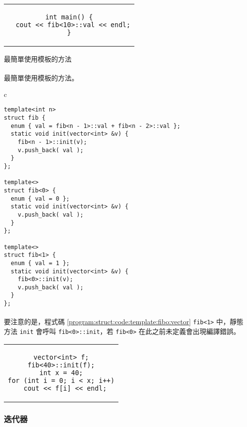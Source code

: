 \documentclass[12pt,a4paper,oneside]{report}
\begin{document}
\begin{CJK}{UTF8}{bkai}
\begin{code}[h!]
\begin{tabular}{c}
\begin{lstlisting}
int main() {
  cout << fib<10>::val << endl;
}
\end{lstlisting}
\end{tabular}
\caption{最簡單使用模板的方法}
\label{program:struct:code:template:fibo}
\end{code}

\paragraph{}最簡單使用模板的方法。

\begin{code}[h!]
\centering
\begin{tabular}{c}
\begin{lstlisting}
template<int n>
struct fib {
  enum { val = fib<n - 1>::val + fib<n - 2>::val };
  static void init(vector<int> &v) {
    fib<n - 1>::init(v);
    v.push_back( val );
  }
};

template<>
struct fib<0> {
  enum { val = 0 };
  static void init(vector<int> &v) {
    v.push_back( val );
  }
};

template<>
struct fib<1> {
  enum { val = 1 };
  static void init(vector<int> &v) {
    fib<0>::init(v);
    v.push_back( val );
  }
};
\end{lstlisting}
\end{tabular}
\caption{把費氏數列裝進 \lstinline!vector! 中}
\label{program:struct:code:template:fibo:vector}
\end{code}

\paragraph{}要注意的是，程式碼 \ref{program:struct:code:template:fibo:vector} \lstinline!fib<1>! 中，靜態方法 \lstinline!init! 會呼叫 \lstinline!fib<0>::init!，若 \lstinline!fib<0>! 在此之前未定義會出現編譯錯誤。

\begin{code}[h!]
\centering
\begin{tabular}{c}
\begin{lstlisting}
vector<int> f;
fib<40>::init(f);
int x = 40;
for (int i = 0; i < x; i++)
  cout << f[i] << endl;
\end{lstlisting}
\end{tabular}
\end{code}

\subsubsection{迭代器}


\end{CJK}
\end{document}
